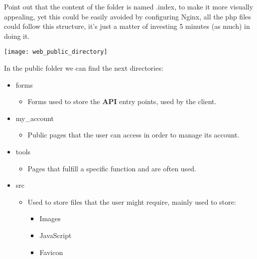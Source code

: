 \begin{flushleft}
    Point out that the content of the folder is named .index, to make it more visually appealing, yet this could be
    easily avoided by configuring Nginx, all the php files could follow this structure, it's just a matter of investing
    5 minutes (as much) in doing it.
\end{flushleft}
\begin{center}
    \texttt{[image: web\_public\_directory]}
\end{center}
In the public folder we can find the next directories:
\begin{itemize}
    \item forms
    \begin{itemize}
        \item Forms used to store the \textbf{API} entry points, used by the client.
    \end{itemize}
    \item my\_account
    \begin{itemize}
        \item Public pages that the user can access in order to manage its account.
    \end{itemize}
    \item tools
    \begin{itemize}
        \item Pages that fulfill a specific function and are often used.
    \end{itemize}
    \item src
    \begin{itemize}
        \item Used to store files that the user might require, mainly used to store:
        \begin{itemize}
            \item Images
            \item JavaScript
            \item Favicon
        \end{itemize}
    \end{itemize}
\end{itemize}
\newpage

